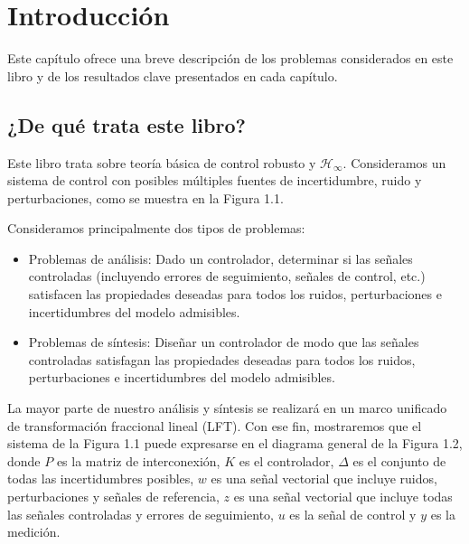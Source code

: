 
\chapter{Introducción}
Este capítulo ofrece una breve descripción de los problemas considerados en este libro y de los resultados clave presentados en cada capítulo.

\section{¿De qué trata este libro?}
Este libro trata sobre teoría básica de control robusto y $\mathcal{H}_{\infty}$. Consideramos un sistema de control con posibles múltiples fuentes de incertidumbre, ruido y perturbaciones, como se muestra en la Figura 1.1.


Consideramos principalmente dos tipos de problemas:

\begin{itemize}
  \item Problemas de análisis: Dado un controlador, determinar si las señales controladas (incluyendo errores de seguimiento, señales de control, etc.) satisfacen las propiedades deseadas para todos los ruidos, perturbaciones e incertidumbres del modelo admisibles.
  \item Problemas de síntesis: Diseñar un controlador de modo que las señales controladas satisfagan las propiedades deseadas para todos los ruidos, perturbaciones e incertidumbres del modelo admisibles.
\end{itemize}

La mayor parte de nuestro análisis y síntesis se realizará en un marco unificado de transformación fraccional lineal (LFT). Con ese fin, mostraremos que el sistema de la Figura 1.1 puede expresarse en el diagrama general de la Figura 1.2, donde $P$ es la matriz de interconexión, $K$ es el controlador, $\Delta$ es el conjunto de todas las incertidumbres posibles, $w$ es una señal vectorial que incluye ruidos, perturbaciones y señales de referencia, $z$ es una señal vectorial que incluye todas las señales controladas y errores de seguimiento, $u$ es la señal de control y $y$ es la medición.


